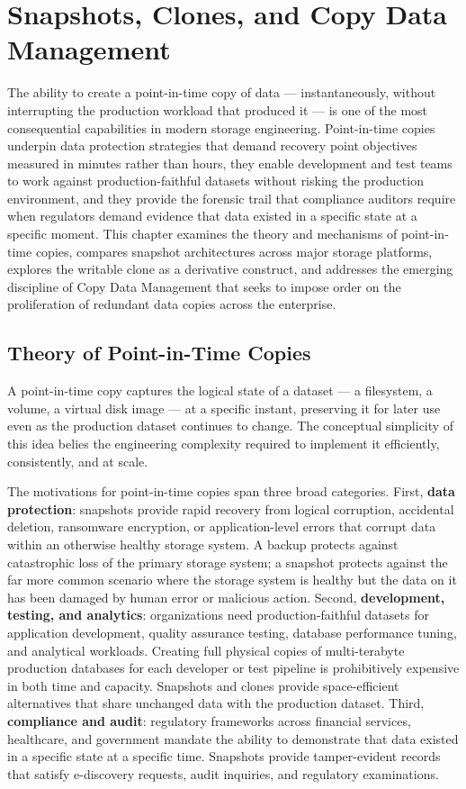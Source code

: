 \chapter{Snapshots, Clones, and Copy Data Management}
\label{ch:10}

The ability to create a point-in-time copy of data --- instantaneously, without interrupting the production workload that produced it --- is one of the most consequential capabilities in modern storage engineering. Point-in-time copies underpin data protection strategies that demand recovery point objectives measured in minutes rather than hours, they enable development and test teams to work against production-faithful datasets without risking the production environment, and they provide the forensic trail that compliance auditors require when regulators demand evidence that data existed in a specific state at a specific moment. This chapter examines the theory and mechanisms of point-in-time copies, compares snapshot architectures across major storage platforms, explores the writable clone as a derivative construct, and addresses the emerging discipline of Copy Data Management that seeks to impose order on the proliferation of redundant data copies across the enterprise.

\section{Theory of Point-in-Time Copies}

A point-in-time copy captures the logical state of a dataset --- a filesystem, a volume, a virtual disk image --- at a specific instant, preserving it for later use even as the production dataset continues to change. The conceptual simplicity of this idea belies the engineering complexity required to implement it efficiently, consistently, and at scale.

The motivations for point-in-time copies span three broad categories. First, \textbf{data protection}: snapshots provide rapid recovery from logical corruption, accidental deletion, ransomware encryption, or application-level errors that corrupt data within an otherwise healthy storage system. A backup protects against catastrophic loss of the primary storage system; a snapshot protects against the far more common scenario where the storage system is healthy but the data on it has been damaged by human error or malicious action. Second, \textbf{development, testing, and analytics}: organizations need production-faithful datasets for application development, quality assurance testing, database performance tuning, and analytical workloads. Creating full physical copies of multi-terabyte production databases for each developer or test pipeline is prohibitively expensive in both time and capacity. Snapshots and clones provide space-efficient alternatives that share unchanged data with the production dataset. Third, \textbf{compliance and audit}: regulatory frameworks across financial services, healthcare, and government mandate the ability to demonstrate that data existed in a specific state at a specific time. Snapshots provide tamper-evident records that satisfy e-discovery requests, audit inquiries, and regulatory examinations.

